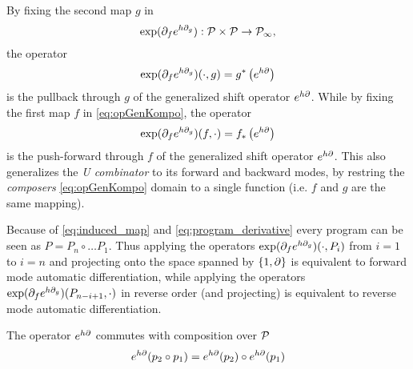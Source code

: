  By fixing the second map $g$ in  
  \begin{equation}\label{eq:opGenKompo}
 \exp(\partial_fe^{h\partial_g}): \mathcal{P}\times\mathcal{P}\to\mathcal{P}_\infty,
  \end{equation}
  the operator
  \begin{equation}
   \exp(\partial_fe^{h\partial_g})(\cdot,g)=g^*\left( e^{h\partial} \right)\label{eq:opKompo}
 \end{equation}
  is the pullback through $g$ of the generalized shift
  operator $e^{h\partial}$. While by
  fixing the first map $f$ in \eqref{eq:opGenKompo}, the operator
  \begin{equation}
 \exp(\partial_fe^{h\partial_g})(f,\cdot)=f_*\left( e^{h\partial} \right)\label{eq:opKompoForward}
 \end{equation} is the
  push-forward through $f$ of the generalized shift
  operator $e^{h\partial}$.
This also generalizes the \emph{U combinator} to its forward and backward modes, by restring the \emph{composers} \eqref{eq:opGenKompo} domain to a single function (i.e. $f$ and $g$ are the same mapping).
 
  \begin{remark}[Unified AD]\label{trd:reverseForward}
  Because of \eqref{eq:induced_map} and \eqref{eq:program_derivative} every program can be seen as $P=P_n\circ\ldots P_1$. Thus applying the operators
  $\exp(\partial_fe^{h\partial_g})(\cdot,P_i)$ from $i=1$ to $i=n$ and projecting onto the space
  spanned by $\{1,\partial\}$ is equivalent to forward mode automatic differentiation,
  while applying the 
  operators $\exp(\partial_fe^{h\partial_g})(P_{n-i+1},\cdot)$ in reverse order (and
  projecting) is equivalent to reverse mode automatic differentiation.
 \end{remark}
 
 

   \begin{corollary}\label{izr:komp_homo}
   The operator $e^{h\partial}$ commutes with composition over $\mathcal{P}$
   \begin{equation*}
   e^{h\partial}(p_2\circ p_1)=e^{h\partial}(p_2)\circ e^{h\partial}(p_1)
   \end{equation*}
   \end{corollary}
   
